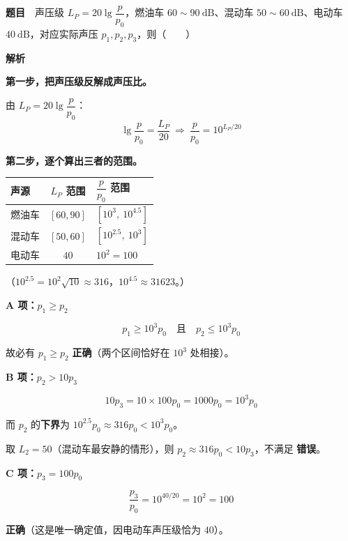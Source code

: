 \textbf{题目}　声压级 $L_P=20\lg\dfrac p{p_0}$，燃油车 $60\sim90\ \mathrm{dB}$、混动车 $50\sim60\ \mathrm{dB}$、电动车 $40\ \mathrm{dB}$，对应实际声压 $p_1,p_2,p_3$，则（　　）

\textbf{解析}

\textbf{第一步，把声压级反解成声压比。}

由 $L_P=20\lg\dfrac p{p_0}$：
\[\lg\frac p{p_0}=\frac{L_P}{20}\ \Longrightarrow\ \frac p{p_0}=10^{L_P/20}\]

\textbf{第二步，逐个算出三者的范围。}

\begin{center}
\begin{tabular}{lcl}
\toprule
声源 & $L_P$ 范围 & $\dfrac p{p_0}$ 范围 \\
\midrule
燃油车 & $[60,90]$ & $\left[10^{3},\ 10^{4.5}\right]$ \\
混动车 & $[50,60]$ & $\left[10^{2.5},\ 10^{3}\right]$ \\
电动车 & $40$ & $10^{2}=100$ \\
\bottomrule
\end{tabular}
\end{center}

（$10^{2.5}=10^2\sqrt{10}\approx316$，$10^{4.5}\approx31623$。）

\par\medskip

\textbf{A 项：$p_1\ge p_2$ }

\[p_1\ge10^{3}p_0\quad\text{且}\quad p_2\le10^{3}p_0\]

故必有 $p_1\ge p_2$  \textbf{正确}（两个区间恰好在 $10^3$ 处相接）。

\par\medskip

\textbf{B 项：$p_2>10p_3$ }

\[10p_3=10\times100p_0=1000p_0=10^{3}p_0\]

而 $p_2$ 的\textbf{下界}为 $10^{2.5}p_0\approx316p_0<10^{3}p_0$。

取 $L_2=50$（混动车最安静的情形），则 $p_2\approx316p_0<10p_3$，不满足  \textbf{错误}。

\par\medskip

\textbf{C 项：$p_3=100p_0$ }

\[\frac{p_3}{p_0}=10^{40/20}=10^{2}=100\]

 \textbf{正确}（这是唯一确定值，因电动车声压级恰为 $40$）。

\par\medskip

